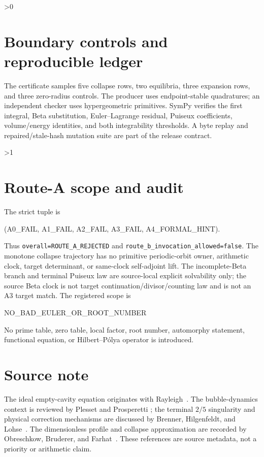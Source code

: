 \documentclass[11pt]{article}
\begin{document}
\ifnum\CRevisionRound>0
\section{Boundary controls and reproducible ledger}
The certificate samples five collapse rows, two equilibria, three expansion
rows, and three zero-radius controls.  The producer uses endpoint-stable
quadratures; an independent checker uses hypergeometric primitives.  SymPy
verifies the first integral, Beta substitution, Euler--Lagrange residual,
Puiseux coefficients, volume/energy identities, and both integrability
thresholds.  A byte replay and repaired/stale-hash mutation suite are part of
the release contract.
\fi

\ifnum\CRevisionRound>1
\section{Route-A scope and audit}
The strict tuple is
\begin{center}\ttfamily
(A0\_FAIL, A1\_FAIL, A2\_FAIL, A3\_FAIL, A4\_FORMAL\_HINT).
\end{center}
Thus \texttt{overall=ROUTE\_A\_REJECTED} and
\texttt{route\_b\_invocation\_allowed=false}.
The monotone collapse trajectory has no primitive periodic-orbit owner,
arithmetic clock, target determinant, or same-clock self-adjoint lift.  The
incomplete-Beta branch and terminal Puiseux law are source-local explicit
solvability only; the source Beta clock is not target continuation/divisor/counting
law and is not an A3 target match.  The registered scope is
\begin{center}\ttfamily NO\_BAD\_EULER\_OR\_ROOT\_NUMBER\end{center}
No prime table, zero table, local factor, root number, automorphy statement,
functional equation, or Hilbert--Pólya operator is introduced.
\fi

\section*{Source note}
The ideal empty-cavity equation originates with Rayleigh~\cite{rayleigh1917}.
The bubble-dynamics context is reviewed by Plesset and Prosperetti
\cite{plesset1977}; the terminal \(2/5\) singularity and physical correction
mechanisms are discussed by Brenner, Hilgenfeldt, and Lohse~\cite{brenner2002}.
The dimensionless profile and collapse approximation are recorded by
Obreschkow, Bruderer, and Farhat~\cite{obreschkow2012}.  These references are
source metadata, not a priority or arithmetic claim.
\end{document}
